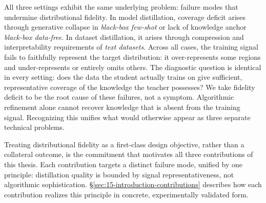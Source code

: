 \begin{foldable}
  All three settings exhibit the same underlying problem: failure modes that undermine distributional fidelity.
  In model distillation, coverage deficit arises through generative collapse in \textit{black-box few-shot} or lack of knowledge anchor \textit{black-box data-free}.
  In dataset distillation, it arises through compression and interpretability requirements of \textit{text datasets}.
  Across all cases, the training signal fails to faithfully represent the target distribution: it over-represents some regions and under-represents or entirely omits others.
  The diagnostic question is identical in every setting: does the data the student actually trains on give sufficient, representative coverage of the knowledge the teacher possesses?
  We take fidelity deficit to be the root cause of these failures, not a symptom.
  Algorithmic refinement alone cannot recover knowledge that is absent from the training signal.
  Recognizing this unifies what would otherwise appear as three separate technical problems.
\end{foldable}

\begin{foldable}
  Treating distributional fidelity as a first-class design objective, rather than a collateral outcome, is the commitment that motivates all three contributions of this thesis.
  Each contribution targets a distinct failure mode, unified by one principle: distillation quality is bounded by signal representativeness, not algorithmic sophistication.
  \S\ref{sec:15-introduction-contributions} describes how each contribution realizes this principle in concrete, experimentally validated form.
\end{foldable}
